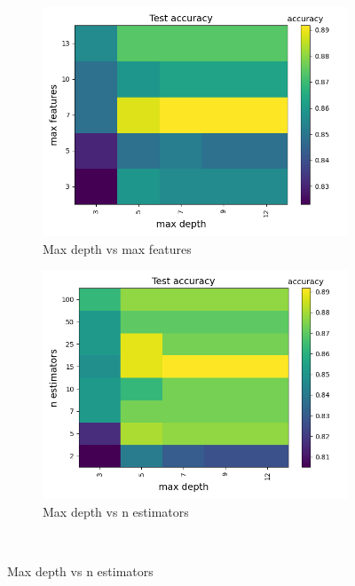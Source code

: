 \documentclass[a4paper]{article}
\begin{document}
\begin{figure}[H]
  \centering
  \begin{subfigure}{0.49\textwidth}
    \includegraphics[scale=0.45]{../figures/random_forest/heatmaps/heatmap_nbins200_pca0_seed4155_ts0.20_accuracy_max_depth_max_features.png}
    \caption{Max depth vs max features}
  \end{subfigure}
  \begin{subfigure}{0.49\textwidth}
    \includegraphics[scale=0.45]{../figures/random_forest/heatmaps/heatmap_nbins200_pca0_seed4155_ts0.20_accuracy_max_depth_n_estimators.png}
    \caption{Max depth vs n estimators}
  \end{subfigure}\\

\end{figure}
\end{document}

